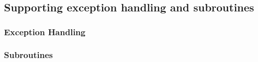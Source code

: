 \subsection{Supporting exception handling and subroutines}\label{specific}


\subsubsection{Exception Handling}
\subsubsection{Subroutines}
